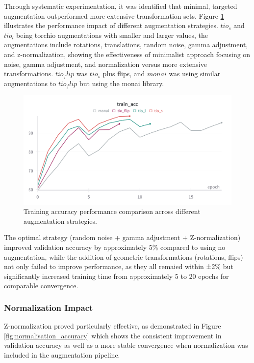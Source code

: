 \documentclass[12pt, a4paper]{article}
\begin{document}
Through systematic experimentation, it was identified that minimal, targeted augmentation outperformed more extensive transformation sets. Figure \ref{fig:augmentation_comparison} illustrates the performance impact of different augmentation strategies. $tio_s$ and $tio_l$ being torchio augmentations with smaller and larger values, the augmentations include rotations, translations, random noise, gamma adjustment, and z-normalization, showing the effectiveness of minimalist approach focusing on noise, gamma adjustment, and normalization versus more extensive transformations. $tio_flip$ was $tio_s$ plus flips, and $monai$ was using similar augmentations to $tio_flip$ but using the monai library.

\begin{figure}[htbp]
  \centering
  \includegraphics[width=\textwidth]{figures/augs_train_acc.png}
  \caption{Training accuracy performance comparison across different augmentation strategies.}
  \label{fig:augmentation_comparison}
\end{figure}

The optimal strategy (random noise + gamma adjustment + Z-normalization) improved validation accuracy by approximately 5\% compared to using no augmentation, while the addition of geometric transformations (rotations, flips) not only failed to improve performance, as they all remaied within ±2\% but significantly increased training time from approximately 5 to 20 epochs for comparable convergence.

\subsubsection{Normalization Impact}

Z-normalization proved particularly effective, as demonstrated in Figure \ref{fig:normalisation_accuracy} which shows the consistent improvement in validation accuracy as well as a more stable convergence when normalization was included in the augmentation pipeline.
\end{document}

